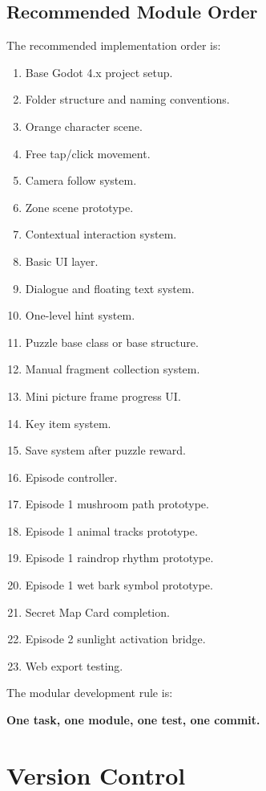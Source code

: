 \documentclass[12pt]{article}
\begin{document}
\subsection{Recommended Module Order}

The recommended implementation order is:

\begin{enumerate}[leftmargin=*]
    \item Base Godot 4.x project setup.
    \item Folder structure and naming conventions.
    \item Orange character scene.
    \item Free tap/click movement.
    \item Camera follow system.
    \item Zone scene prototype.
    \item Contextual interaction system.
    \item Basic UI layer.
    \item Dialogue and floating text system.
    \item One-level hint system.
    \item Puzzle base class or base structure.
    \item Manual fragment collection system.
    \item Mini picture frame progress UI.
    \item Key item system.
    \item Save system after puzzle reward.
    \item Episode controller.
    \item Episode 1 mushroom path prototype.
    \item Episode 1 animal tracks prototype.
    \item Episode 1 raindrop rhythm prototype.
    \item Episode 1 wet bark symbol prototype.
    \item Secret Map Card completion.
    \item Episode 2 sunlight activation bridge.
    \item Web export testing.
\end{enumerate}

The modular development rule is:

\begin{center}
\textbf{One task, one module, one test, one commit.}
\end{center}

\section{Version Control}
\end{document}
